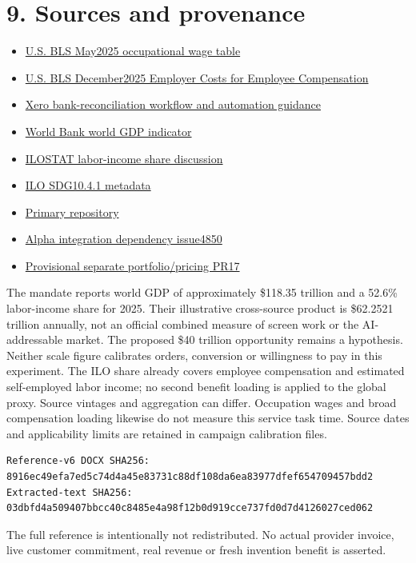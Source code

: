 \documentclass[10pt,letterpaper]{article}
\begin{document}
\section*{9. Sources and provenance}
\begin{itemize}
\item \href{https://www.bls.gov/news.release/ocwage.t01.htm}{U.S. BLS May2025 occupational wage table}
\item \href{https://www.bls.gov/news.release/archives/ecec_03202026.htm}{U.S. BLS December2025 Employer Costs for Employee Compensation}
\item \href{https://www.xero.com/us/guides/how-to-do-bank-reconciliation/}{Xero bank-reconciliation workflow and automation guidance}
\item \href{https://data.worldbank.org/?locations=1W-US}{World Bank world GDP indicator}
\item \href{https://ilostat.ilo.org/blog/the-world-of-work-and-the-2030-agenda-a-ten-year-review/}{ILOSTAT labor-income share discussion}
\item \href{https://unstats.un.org/sdgs/metadata/files/Metadata-10-04-01.pdf}{ILO SDG10.4.1 metadata}
\item \href{https://github.com/MontrealAI/AGI-Alpha-Invention-Flywheel-Lab}{Primary repository}
\item \href{https://github.com/MontrealAI/AGI-Alpha-Agent-v0/issues/4850}{Alpha integration dependency issue4850}
\item \href{https://github.com/MontrealAI/AGI-Alpha-Invention-Flywheel-Lab/pull/17}{Provisional separate portfolio/pricing PR17}
\end{itemize}
The mandate reports world GDP of approximately \$118.35 trillion and a 52.6\% labor-income share for 2025. Their illustrative cross-source product is \$62.2521 trillion annually, not an official combined measure of screen work or the AI-addressable market. The proposed \$40 trillion opportunity remains a hypothesis. Neither scale figure calibrates orders, conversion or willingness to pay in this experiment. The ILO share already covers employee compensation and estimated self-employed labor income; no second benefit loading is applied to the global proxy. Source vintages and aggregation can differ. Occupation wages and broad compensation loading likewise do not measure this service task time. Source dates and applicability limits are retained in campaign calibration files.

\begin{Verbatim}[fontsize=\scriptsize,breaklines=true]
Reference-v6 DOCX SHA256: 8916ec49efa7ed5c74d4a45e83731c88df108da6ea83977dfef654709457bdd2
Extracted-text SHA256: 03dbfd4a509407bbcc40c8485e4a98f12b0d919cce737fd0d7d4126027ced062
\end{Verbatim}
The full reference is intentionally not redistributed. No actual provider invoice, live customer commitment, real revenue or fresh invention benefit is asserted.
\end{document}
